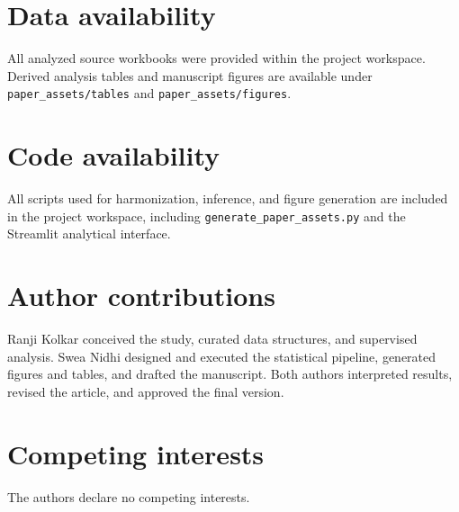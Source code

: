 \documentclass[pdflatex,sn-mathphys-num]{sn-jnl}
\begin{document}
\section{Data availability}
All analyzed source workbooks were provided within the project workspace. Derived analysis tables and manuscript figures are available under \texttt{paper\_assets/tables} and \texttt{paper\_assets/figures}.

\section{Code availability}
All scripts used for harmonization, inference, and figure generation are included in the project workspace, including \texttt{generate\_paper\_assets.py} and the Streamlit analytical interface.

\section{Author contributions}
Ranji Kolkar conceived the study, curated data structures, and supervised analysis. Swea Nidhi designed and executed the statistical pipeline, generated figures and tables, and drafted the manuscript. Both authors interpreted results, revised the article, and approved the final version.

\section{Competing interests}
The authors declare no competing interests.


\end{document}
